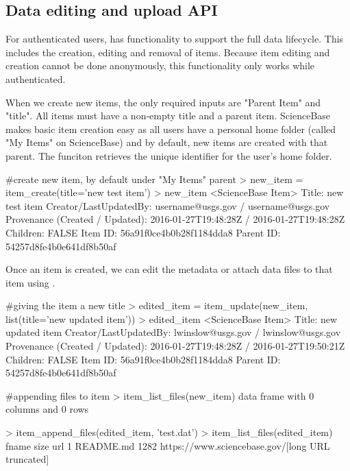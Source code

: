 
\subsection{Data editing and upload API}
For authenticated users,  has functionality to support 
the full data lifecycle. This includes the creation, editing and removal
of items. Because item editing and creation cannot be done anonymously, 
this functionality only works while authenticated.

When we create new items, the only required inputs are "Parent Item" and "title". All 
items must have a non-empty title and a parent item. ScienceBase makes basic item creation
easy as all users have a personal home folder (called "My Items" on ScienceBase) and by default,
new items are created with that parent. The funciton  retrieves the
unique identifier for the user's home folder. 

\begin{example}
#create new item, by default under "My Items" parent
> new_item = item_create(title='new test item')
> new_item
<ScienceBase Item> 
  Title: new test item
  Creator/LastUpdatedBy:     username@usgs.gov / username@usgs.gov
  Provenance (Created / Updated):  2016-01-27T19:48:28Z / 2016-01-27T19:48:28Z
  Children: FALSE
  Item ID: 56a91f0ce4b0b28f1184dda8
  Parent ID: 54257d8fe4b0e641df8b50af
\end{example}

Once an item is created, we can edit the metadata or attach data files to that 
item using . 

\begin{example}
#giving the item a new title
> edited_item = item_update(new_item, list(title='new updated item'))
> edited_item
<ScienceBase Item> 
  Title: new updated item
  Creator/LastUpdatedBy:     lwinslow@usgs.gov / lwinslow@usgs.gov
  Provenance (Created / Updated):  2016-01-27T19:48:28Z / 2016-01-27T19:50:21Z
  Children: FALSE
  Item ID: 56a91f0ce4b0b28f1184dda8
  Parent ID: 54257d8fe4b0e641df8b50af

#appending files to item
> item_list_files(new_item)
data frame with 0 columns and 0 rows

> item_append_files(edited_item, 'test.dat')
> item_list_files(edited_item)
      fname size     url
1 README.md 1282     https://www.sciencebase.gov/[long URL truncated]


\end{example}

